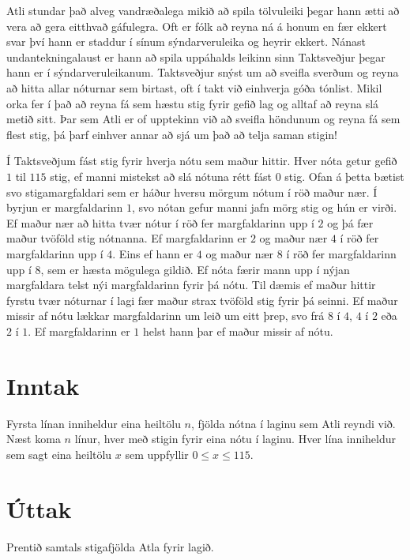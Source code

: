 
Atli stundar það alveg vandræðalega mikið að spila tölvuleiki þegar hann ætti að vera að gera eitthvað gáfulegra.
Oft er fólk að reyna ná á honum en fær ekkert svar því hann er staddur í sínum sýndarveruleika og heyrir ekkert.
Nánast undantekningalaust er hann að spila uppáhalds leikinn sinn Taktsveðjur þegar hann er í sýndarveruleikanum.
Taktsveðjur snýst um að sveifla sverðum og reyna að hitta allar nóturnar sem birtast,
oft í takt við einhverja góða tónlist.
Mikil orka fer í það að reyna fá sem hæstu stig fyrir gefið lag og alltaf að reyna slá metið sitt.
Þar sem Atli er of upptekinn við að sveifla höndunum og reyna fá sem flest stig, 
þá þarf einhver annar að sjá um það að telja saman stigin!

Í Taktsveðjum fást stig fyrir hverja nótu sem maður hittir. 
Hver nóta getur gefið $1$ til $115$ stig, ef manni mistekst að slá nótuna rétt fást $0$ stig.
Ofan á þetta bætist svo stigamargfaldari sem er háður hversu mörgum nótum í röð maður nær.
Í byrjun er margfaldarinn $1$, svo nótan gefur manni jafn mörg stig og hún er virði.
Ef maður nær að hitta tvær nótur í röð fer margfaldarinn upp í $2$ og þá fær maður tvöföld stig nótnanna.
Ef margfaldarinn er $2$ og maður nær $4$ í röð fer margfaldarinn upp í $4$.
Eins ef hann er $4$ og maður nær $8$ í röð fer margfaldarinn upp í $8$, sem er hæsta mögulega gildið.
Ef nóta færir mann upp í nýjan margfaldara telst nýi margfaldarinn fyrir þá nótu.
Til dæmis ef maður hittir fyrstu tvær nóturnar í lagi fær maður strax tvöföld stig fyrir þá seinni.
Ef maður missir af nótu lækkar margfaldarinn um leið um eitt þrep, 
svo frá $8$ í $4$, $4$ í $2$ eða $2$ í $1$.
Ef margfaldarinn er $1$ helst hann þar ef maður missir af nótu.

\section*{Inntak}
Fyrsta línan inniheldur eina heiltölu $n$, fjölda nótna í laginu sem Atli reyndi við.
Næst koma $n$ línur, hver með stigin fyrir eina nótu í laginu. 
Hver lína inniheldur sem sagt eina heiltölu $x$ sem uppfyllir $0 \leq x \leq 115$.

\section*{Úttak}
Prentið samtals stigafjölda Atla fyrir lagið.

